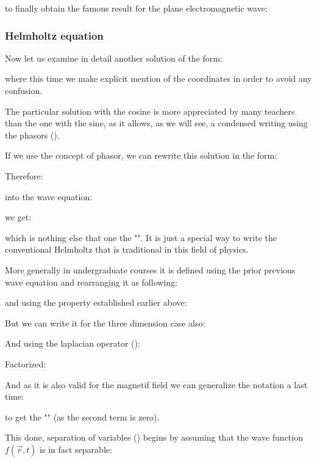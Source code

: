 	to finally obtain the famous result for the plane electromagnetic wave:
	
	
	\subsubsection{Helmholtz equation}
	Now let us examine in detail another solution of the form:
	
	where this time we make explicit mention of the coordinates in order to avoid any confusion.
	\begin{tcolorbox}[title=Remark,colframe=black,arc=10pt]
	The particular solution with the cosine is more appreciated by many teachers than the one with the sine, as it allows, as we will see, a condensed writing using the phasors ().
	\end{tcolorbox}
	If we use the concept of phasor, we can rewrite this solution in the form:
	
	Therefore:
	
	into the wave equation:
	
	we get:
	
	which is nothing else that one the "". It is just a special way to write the conventional Helmholtz that is traditional in this field of physics.

	More generally in undergraduate courses it is defined using the prior previous wave equation and rearranging it as following:
	
	and using the property established earlier above:
	
	But we can write it for the three dimension case also:
	
	And using the laplacian operator ():
	
	Factorized:
	
	And as it is also valid for the magnetif field we can generalize the notation a last time:
	
	to get the "" (as the second term is zero).

	This done, separation of variables () begins by assuming that the wave function $f(\vec{r}, t)$ is in fact separable:
	
